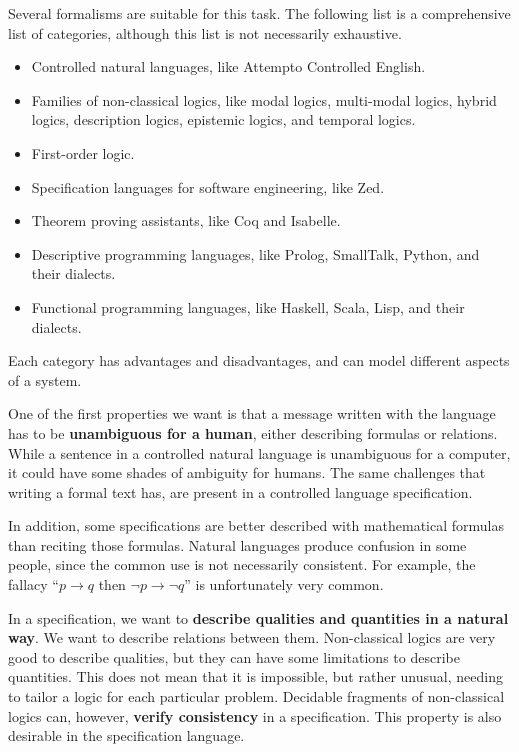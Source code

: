 Several formalisms are suitable for this task.
The following list is a comprehensive list of categories, although this list is not necessarily exhaustive.
\begin{itemize}
    \item Controlled natural languages, like Attempto Controlled English.
    \item Families of non-classical logics, like modal logics, multi-modal logics, hybrid logics, description logics, epistemic logics, and temporal logics.
    \item First-order logic.
    \item Specification languages for software engineering, like Zed.
    \item Theorem proving assistants, like Coq and Isabelle.
    \item Descriptive programming languages, like Prolog, SmallTalk, Python, and their dialects.
    \item Functional programming languages, like Haskell, Scala, Lisp, and their dialects.
\end{itemize}

Each category has advantages and disadvantages, and can model different aspects of a system.

One of the first properties we want is that a message written with the language has to be \textbf{unambiguous for a human}, either describing formulas or relations.
While a sentence in a controlled natural language is unambiguous for a computer, it could have some shades of ambiguity for humans.
The same challenges that writing a formal text has, are present in a controlled language specification.

In addition, some specifications are better described with mathematical formulas than reciting those formulas.
Natural languages produce confusion in some people, since the common use is not necessarily consistent.
For example, the fallacy ``$p \to q$ then $\lnot p \to \lnot q$'' is unfortunately very common.

In a specification, we want to \textbf{describe qualities and quantities in a natural way}.
We want to describe relations between them.
Non-classical logics are very good to describe qualities, but they can have some limitations to describe quantities.
This does not mean that it is impossible, but rather unusual, needing to tailor a logic for each particular problem.
Decidable fragments of non-classical logics can, however, \textbf{verify consistency} in a specification.
This property is also desirable in the specification language.


